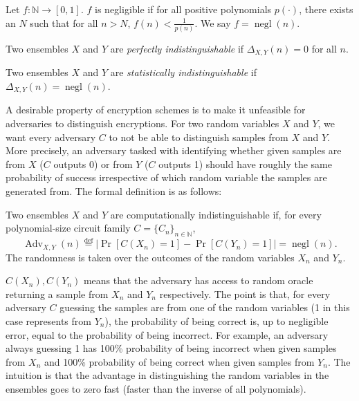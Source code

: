 \begin{definition}
    Let $f \colon \mathbb{N} \to [0,1]$. $f$ is negligible if for all positive polynomials $p(\cdot)$, there exists an $N$ such that for all $n>N$, $f(n) < \frac{1}{p(n)}$. We say $f = \operatorname{negl}(n)$.
\end{definition}

\begin{definition}
    Two ensembles $X$ and $Y$ are \textit{perfectly indistinguishable} if $\Delta_{X,Y}(n) = 0$ for all $n$.
\end{definition}
\begin{definition}
    Two ensembles $X$ and $Y$ are \textit{statistically indistinguishable} if $\Delta_{X,Y}(n) = \operatorname{negl}(n)$.
\end{definition}

 A desirable property of encryption schemes is to make it unfeasible for adversaries to distinguish encryptions. For two random variables $X$ and $Y$, we want every adversary $C$ to not be able to distinguish samples from $X$ and $Y$. More precisely, an adversary tasked with identifying whether given samples are from $X$ ($C$ outputs 0) or from $Y$ ($C$ outputs 1) should have roughly the same probability of success irrespective of which random variable the samples are generated from. The formal definition is as follows:
 
\begin{definition}
    Two ensembles $X$ and $Y$ are computationally indistinguishable if, for every polynomial-size circuit family $C = \{C_n\}_{n \in \mathbb{N}}$, $$\operatorname{Adv}_{X,Y}(n) \stackrel{\mathrm{def}}{=} |\operatorname{Pr}[C(X_n) = 1] - \operatorname{Pr}[C(Y_n) = 1]| = \operatorname{negl}(n).$$
    The randomness is taken over the outcomes of the random variables $X_n$ and $Y_n$.
\end{definition}

$C(X_n), C(Y_n)$ means that the adversary has access to random oracle returning a sample from $X_n$ and $Y_n$ respectively. The point is that, for every adversary $C$ guessing the samples are from one of the random variables (1 in this case represents from $Y_n$), the probability of being correct is, up to negligible error, equal to the probability of being incorrect. For example, an adversary always guessing 1 has 100\% probability of being incorrect when given samples from $X_n$ and 100\% probability of being correct when given samples from $Y_n$. The intuition is that the advantage in distinguishing the random variables in the ensembles goes to zero fast (faster than the inverse of all polynomials).

